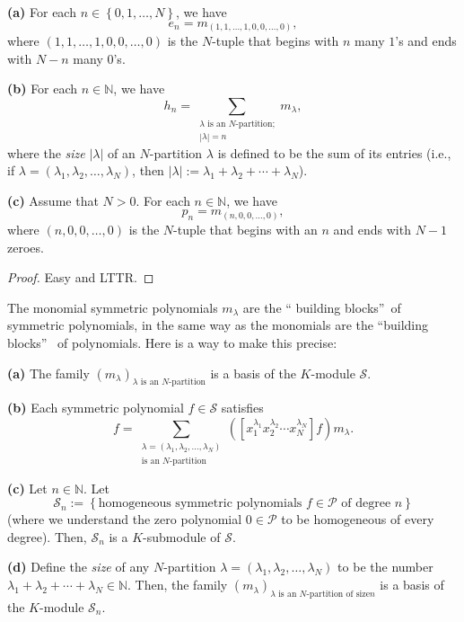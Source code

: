 \begin{proposition}
\label{prop.sf.ehp-through-m}\textbf{(a)} For each $n\in\left\{
0,1,\ldots,N\right\}  $, we have%
\[
e_{n}=m_{\left(  1,1,\ldots,1,0,0,\ldots,0\right)  },
\]
where $\left(  1,1,\ldots,1,0,0,\ldots,0\right)  $ is the $N$-tuple that
begins with $n$ many $1$'s and ends with $N-n$ many $0$'s. \medskip

\textbf{(b)} For each $n\in\mathbb{N}$, we have%
\[
h_{n}=\sum_{\substack{\lambda\text{ is an }N\text{-partition;}\\\left\vert
\lambda\right\vert =n}}m_{\lambda},
\]
where the \emph{size} $\left\vert \lambda\right\vert $ of an $N$-partition
$\lambda$ is defined to be the sum of its entries (i.e., if $\lambda=\left(
\lambda_{1},\lambda_{2},\ldots,\lambda_{N}\right)  $, then $\left\vert
\lambda\right\vert :=\lambda_{1}+\lambda_{2}+\cdots+\lambda_{N}$). \medskip

\textbf{(c)} Assume that $N>0$. For each $n\in\mathbb{N}$, we have%
\[
p_{n}=m_{\left(  n,0,0,\ldots,0\right)  },
\]
where $\left(  n,0,0,\ldots,0\right)  $ is the $N$-tuple that begins with an
$n$ and ends with $N-1$ zeroes.
\end{proposition}

\begin{proof}
Easy and LTTR.
\end{proof}

The monomial symmetric polynomials $m_{\lambda}$ are the \textquotedblleft
building blocks\textquotedblright\ of symmetric polynomials, in the same way
as the monomials are the \textquotedblleft building blocks\textquotedblright%
\ of polynomials. Here is a way to make this precise:

\begin{theorem}
\label{thm.sf.m-basis}\textbf{(a)} The family $\left(  m_{\lambda}\right)
_{\lambda\text{ is an }N\text{-partition}}$ is a basis of the $K$-module
$\mathcal{S}$. \medskip

\textbf{(b)} Each symmetric polynomial $f\in\mathcal{S}$ satisfies%
\[
f=\sum_{\substack{\lambda=\left(  \lambda_{1},\lambda_{2},\ldots,\lambda
_{N}\right)  \\\text{is an }N\text{-partition}}}\left(  \left[  x_{1}%
^{\lambda_{1}}x_{2}^{\lambda_{2}}\cdots x_{N}^{\lambda_{N}}\right]  f\right)
m_{\lambda}.
\]


\textbf{(c)} Let $n\in\mathbb{N}$. Let%
\[
\mathcal{S}_{n}:=\left\{  \text{homogeneous symmetric polynomials }%
f\in\mathcal{P}\text{ of degree }n\right\}
\]
(where we understand the zero polynomial $0\in\mathcal{P}$ to be homogeneous
of every degree). Then, $\mathcal{S}_{n}$ is a $K$-submodule of $\mathcal{S}$.
\medskip

\textbf{(d)} Define the \emph{size} of any $N$-partition $\lambda=\left(
\lambda_{1},\lambda_{2},\ldots,\lambda_{N}\right)  $ to be the number
$\lambda_{1}+\lambda_{2}+\cdots+\lambda_{N}\in\mathbb{N}$. Then, the family
$\left(  m_{\lambda}\right)  _{\lambda\text{ is an }N\text{-partition of size
}n}$ is a basis of the $K$-module $\mathcal{S}_{n}$.
\end{theorem}

